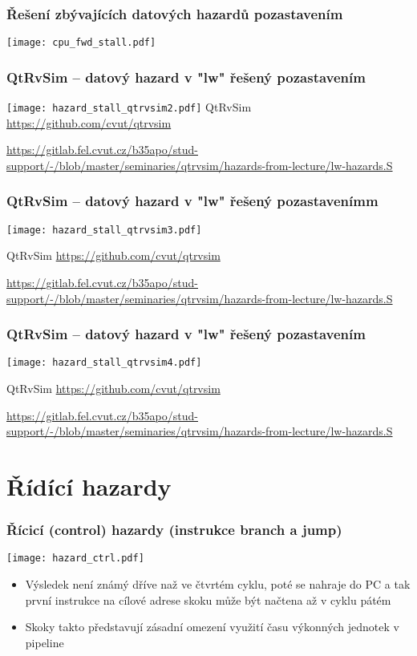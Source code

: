 \documentclass{beamer}
\begin{document}
\begin{frame}
\frametitle{Řešení zbývajících datových hazardů pozastavením}
\texttt{[image: cpu\_fwd\_stall.pdf]}
\end{frame}

\begin{frame}
\frametitle{QtRvSim -- datový hazard v "lw" řešený pozastavením}
\texttt{[image: hazard\_stall\_qtrvsim2.pdf]}
{\tiny
QtRvSim \url{https://github.com/cvut/qtrvsim}
}

{\Tiny
\url{https://gitlab.fel.cvut.cz/b35apo/stud-support/-/blob/master/seminaries/qtrvsim/hazards-from-lecture/lw-hazards.S}
}

\end{frame}

\begin{frame}
\frametitle{QtRvSim -- datový hazard v "lw" řešený pozastavenímm}
\texttt{[image: hazard\_stall\_qtrvsim3.pdf]}

{\tiny
QtRvSim \url{https://github.com/cvut/qtrvsim}
}

{\Tiny
\url{https://gitlab.fel.cvut.cz/b35apo/stud-support/-/blob/master/seminaries/qtrvsim/hazards-from-lecture/lw-hazards.S}
}

\end{frame}

\begin{frame}
\frametitle{QtRvSim -- datový hazard v "lw" řešený pozastavením}
\texttt{[image: hazard\_stall\_qtrvsim4.pdf]}

{\tiny
QtRvSim \url{https://github.com/cvut/qtrvsim}
}

{\Tiny
\url{https://gitlab.fel.cvut.cz/b35apo/stud-support/-/blob/master/seminaries/qtrvsim/hazards-from-lecture/lw-hazards.S}
}

\end{frame}

\section{Řídící hazardy}

\begin{frame}
\frametitle{Řícicí (control) hazardy (instrukce branch a jump)}
\texttt{[image: hazard\_ctrl.pdf]}

\begin{itemize}
 \item Výsledek není známý dříve naž ve čtvrtém cyklu, poté se nahraje do PC
       a tak první instrukce na cílové adrese skoku může být načtena až v cyklu pátém
 \item Skoky takto představují zásadní omezení využití času výkonných jednotek v pipeline
\end{itemize}

\end{frame}
\end{document}
